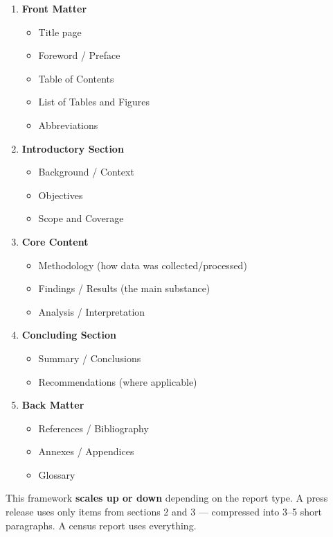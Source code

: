 \documentclass[11pt,a4paper,oneside]{book}
\begin{document}
\begin{tcolorbox}[nsoshadedbox, title=\textbf{Universal Structure Blueprint}]
\begin{enumerate}[label=\textbf{\arabic*.}]
    \item \textbf{Front Matter}
    \begin{itemize}
        \item Title page
        \item Foreword / Preface
        \item Table of Contents
        \item List of Tables and Figures
        \item Abbreviations
    \end{itemize}
    \item \textbf{Introductory Section}
    \begin{itemize}
        \item Background / Context
        \item Objectives
        \item Scope and Coverage
    \end{itemize}
    \item \textbf{Core Content}
    \begin{itemize}
        \item Methodology (how data was collected/processed)
        \item Findings / Results (the main substance)
        \item Analysis / Interpretation
    \end{itemize}
    \item \textbf{Concluding Section}
    \begin{itemize}
        \item Summary / Conclusions
        \item Recommendations (where applicable)
    \end{itemize}
    \item \textbf{Back Matter}
    \begin{itemize}
        \item References / Bibliography
        \item Annexes / Appendices
        \item Glossary
    \end{itemize}
\end{enumerate}
\end{tcolorbox}

This framework \textbf{scales up or down} depending on the report type. A press release uses only items from sections 2 and 3 --- compressed into 3--5 short paragraphs. A census report uses everything.
\end{document}
